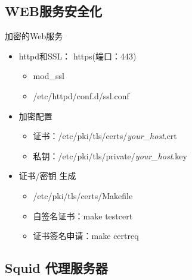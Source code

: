 \subsection{WEB服务安全化}


\begin{frame}{加密的Web服务}
\begin{itemize}
\item httpd和SSL： https(端口：443)

\begin{itemize}
\item mod\_ssl
\item /etc/httpd/conf.d/ssl.conf
\end{itemize}
\item 加密配置

\begin{itemize}
\item 证书：/etc/pki/tls/certs/\emph{your\_host}.crt
\item 私钥：/etc/pki/tls/private/\emph{your\_host}.key
\end{itemize}
\item 证书/密钥 生成

\begin{itemize}
\item /etc/pki/tls/certs/Makefile
\item 自签名证书：make testcert
\item 证书签名申请：make certreq
\end{itemize}
\end{itemize}

\end{frame} 
\subsection{Squid 代理服务器}

